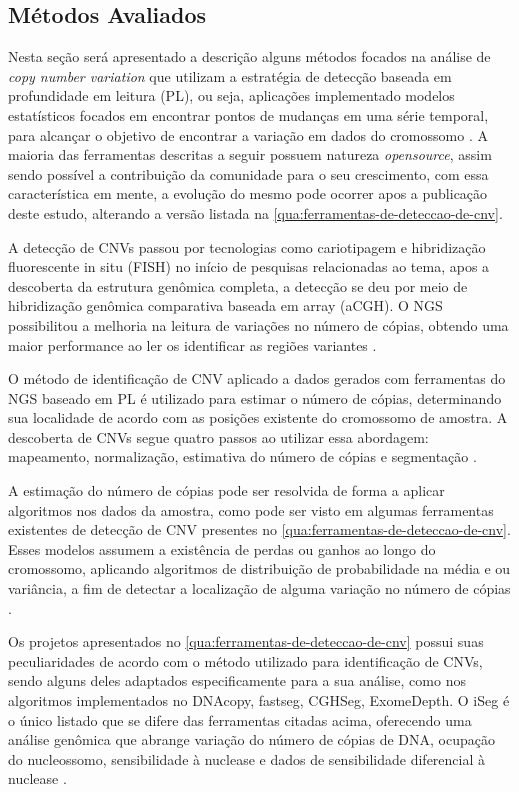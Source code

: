 \subsection{Métodos Avaliados} 

Nesta seção será apresentado a descrição alguns métodos focados na análise de \textit{copy number variation} que utilizam a estratégia de detecção baseada em profundidade em leitura (PL), ou seja, aplicações implementado modelos estatísticos focados em encontrar pontos de mudanças em uma série temporal, para alcançar o objetivo de encontrar a variação em dados do cromossomo \cite{Zhao2013}. A maioria das ferramentas descritas a seguir possuem natureza \textit{opensource}, assim sendo possível a contribuição da comunidade para o seu crescimento, com essa característica em mente, a evolução do mesmo pode ocorrer apos a publicação deste estudo, alterando a versão listada na \autoref{qua:ferramentas-de-deteccao-de-cnv}.


A detecção de CNVs passou por tecnologias como cariotipagem e hibridização fluorescente in situ (FISH) no início de pesquisas relacionadas ao tema, apos a descoberta da estrutura genômica completa, a detecção se deu por meio de hibridização genômica comparativa baseada em array (aCGH). O NGS possibilitou a melhoria na leitura de variações no número de cópias, obtendo uma maior performance ao ler os identificar as regiões variantes \cite{Zhao2013}. 

O método de identificação de CNV aplicado a dados gerados com ferramentas do NGS baseado em PL é utilizado para estimar o número de cópias, determinando sua localidade de acordo com as posições existente do cromossomo de amostra. A descoberta de CNVs segue quatro passos ao utilizar essa abordagem: mapeamento, normalização, estimativa do número de cópias e segmentação \cite{Zhao2013}.

A estimação do número de cópias pode ser resolvida de forma a aplicar algoritmos nos dados da amostra, como pode ser visto em algumas ferramentas existentes de detecção de CNV presentes no \autoref{qua:ferramentas-de-deteccao-de-cnv}. Esses modelos assumem a existência de perdas ou ganhos ao longo do cromossomo, aplicando algoritmos de distribuição de probabilidade na média e ou variância, a fim de detectar a localização de alguma variação no número de cópias \cite{Zhao2013}.



Os projetos apresentados no \autoref{qua:ferramentas-de-deteccao-de-cnv} possui suas peculiaridades de acordo com o método utilizado para identificação de CNVs, sendo alguns deles adaptados especificamente para a sua análise, como nos algoritmos implementados no DNAcopy, fastseg, CGHSeg, ExomeDepth. O iSeg é o único listado que se difere das ferramentas citadas acima, oferecendo uma análise genômica que abrange variação do número de cópias de DNA, ocupação do nucleossomo, sensibilidade à nuclease e dados de sensibilidade diferencial à nuclease \cite{Girimurugan2018}. 

